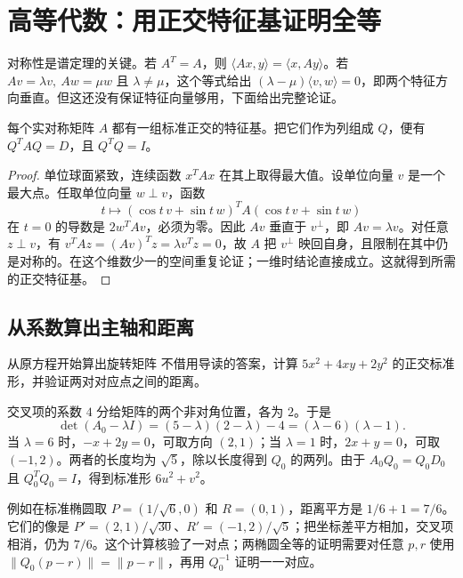 \chapter{高等代数：用正交特征基证明全等}
\label{ch:linear}

对称性是谱定理的关键。若 $A^T=A$，则 $\langle Ax,y\rangle=\langle x,Ay\rangle$。若 $Av=\lambda v,\ Aw=\mu w$ 且 $\lambda\ne\mu$，这个等式给出 $(\lambda-\mu)\langle v,w\rangle=0$，即两个特征方向垂直。但这还没有保证特征向量够用，下面给出完整论证。

\begin{theorem}[实对称矩阵的谱定理]
每个实对称矩阵 $A$ 都有一组标准正交的特征基。把它们作为列组成 $Q$，便有 $Q^TAQ=D$，且 $Q^TQ=I$。
\end{theorem}
\begin{proof}
单位球面紧致，连续函数 $x^TAx$ 在其上取得最大值。设单位向量 $v$ 是一个最大点。任取单位向量 $w\perp v$，函数
\[
t\longmapsto(\cos t\,v+\sin t\,w)^TA(\cos t\,v+\sin t\,w)
\]
在 $t=0$ 的导数是 $2w^TAv$，必须为零。因此 $Av$ 垂直于 $v^\perp$，即 $Av=\lambda v$。对任意 $z\perp v$，有 $v^TAz=(Av)^Tz=\lambda v^Tz=0$，故 $A$ 把 $v^\perp$ 映回自身，且限制在其中仍是对称的。在这个维数少一的空间重复论证；一维时结论直接成立。这就得到所需的正交特征基。
\end{proof}

\section{从系数算出主轴和距离}

\begin{example}{从原方程开始算出旋转矩阵}
不借用导读的答案，计算 $5x^2+4xy+2y^2$ 的正交标准形，并验证两对对应点之间的距离。
\end{example}
\begin{solution}
交叉项的系数 $4$ 分给矩阵的两个非对角位置，各为 $2$。于是
\[
\det(A_0-\lambda I)=(5-\lambda)(2-\lambda)-4
=(\lambda-6)(\lambda-1).
\]
当 $\lambda=6$ 时，$-x+2y=0$，可取方向 $(2,1)$；当 $\lambda=1$ 时，$2x+y=0$，可取 $(-1,2)$。两者的长度均为 $\sqrt5$，除以长度得到 $Q_0$ 的两列。由于 $A_0Q_0=Q_0D_0$ 且 $Q_0^TQ_0=I$，得到标准形 $6u^2+v^2$。

例如在标准椭圆取 $P=(1/\sqrt6,0)$ 和 $R=(0,1)$，距离平方是 $1/6+1=7/6$。它们的像是 $P'=(2,1)/\sqrt{30}$、$R'=(-1,2)/\sqrt5$；把坐标差平方相加，交叉项相消，仍为 $7/6$。这个计算核验了一对点；两椭圆全等的证明需要对任意 $p,r$ 使用 $\|Q_0(p-r)\|=\|p-r\|$，再用 $Q_0^{-1}$ 证明一一对应。
\end{solution}

